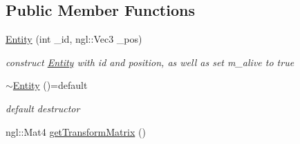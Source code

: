 \subsection*{Public Member Functions}
\begin{DoxyCompactItemize}
\item 
\hyperlink{class_entity_a137651f62fa6c72984b83ff6c803fa37}{Entity} (int \-\_\-id, ngl\-::\-Vec3 \-\_\-pos)
\begin{DoxyCompactList}\small\item\em construct \hyperlink{class_entity}{Entity} with id and position, as well as set m\-\_\-alive to true \end{DoxyCompactList}\item 
\hypertarget{class_entity_aa6ecb9c57b29b60cc49fe44ad4088ecf}{\hyperlink{class_entity_aa6ecb9c57b29b60cc49fe44ad4088ecf}{$\sim$\-Entity} ()=default}\label{class_entity_aa6ecb9c57b29b60cc49fe44ad4088ecf}

\begin{DoxyCompactList}\small\item\em default destructor \end{DoxyCompactList}\item 
\hypertarget{class_entity_af4b2df22cccd334f7842055377ef45d2}{ngl\-::\-Mat4 \hyperlink{class_entity_af4b2df22cccd334f7842055377ef45d2}{get\-Transform\-Matrix} ()}\label{class_entity_af4b2df22cccd334f7842055377ef45d2}


\end{DoxyCompactItemize}

